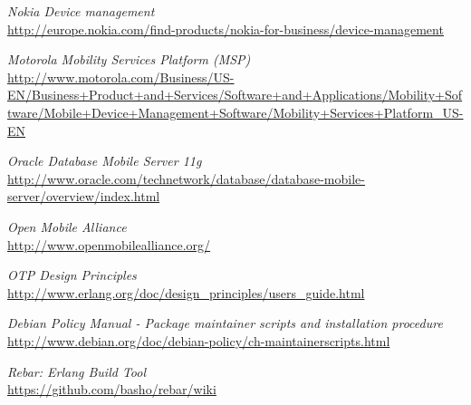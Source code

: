 \documentclass[10pt]{article}
\begin{document}
\begin{thebibliography}{99}

\emph{Nokia Device management} \\
\url{http://europe.nokia.com/find-products/nokia-for-business/device-management}

\emph{Motorola Mobility Services Platform (MSP)} \\
\url{http://www.motorola.com/Business/US-EN/Business+Product+and+Services/Software+and+Applications/Mobility+Software/Mobile+Device+Management+Software/Mobility+Services+Platform_US-EN}

\emph{Oracle Database Mobile Server 11g} \\
\url{http://www.oracle.com/technetwork/database/database-mobile-server/overview/index.html}

\emph{Open Mobile Alliance} \\
\url{http://www.openmobilealliance.org/}

\emph{OTP Design Principles} \\
\url{http://www.erlang.org/doc/design_principles/users_guide.html}

\emph{Debian Policy Manual - Package maintainer scripts and installation procedure} \\
\url{http://www.debian.org/doc/debian-policy/ch-maintainerscripts.html}

\emph{Rebar: Erlang Build Tool} \\
\url{https://github.com/basho/rebar/wiki}

\end{thebibliography}
\end{document}
